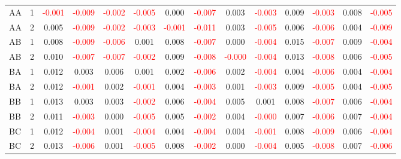 \begin{table}[!htb]
{\begin{tabular}{llcccccccccccc}
AA & 1 & \textcolor{red}{-0.001} & \textcolor{red}{-0.009} & \textcolor{red}{-0.002} & \textcolor{red}{-0.005} & 0.000 & \textcolor{red}{-0.007} & 0.003 & \textcolor{red}{-0.003} & 0.009 & \textcolor{red}{-0.003} & 0.008 & \textcolor{red}{-0.005}\\
AA & 2 & 0.005 & \textcolor{red}{-0.009} & \textcolor{red}{-0.002} & \textcolor{red}{-0.003} & \textcolor{red}{-0.001} & \textcolor{red}{-0.011} & 0.003 & \textcolor{red}{-0.005} & 0.006 & \textcolor{red}{-0.006} & 0.004 & \textcolor{red}{-0.009}\\
AB & 1 & 0.008 & \textcolor{red}{-0.009} & \textcolor{red}{-0.006} & 0.001 & 0.008 & \textcolor{red}{-0.007} & 0.000 & \textcolor{red}{-0.004} & 0.015 & \textcolor{red}{-0.007} & 0.009 & \textcolor{red}{-0.004}\\
AB & 2 & 0.010 & \textcolor{red}{-0.007} & \textcolor{red}{-0.007} & \textcolor{red}{-0.002} & 0.009 & \textcolor{red}{-0.008} & \textcolor{red}{-0.000} & \textcolor{red}{-0.004} & 0.013 & \textcolor{red}{-0.008} & 0.006 & \textcolor{red}{-0.005}\\
BA & 1 & 0.012 & 0.003 & 0.006 & 0.001 & 0.002 & \textcolor{red}{-0.006} & 0.002 & \textcolor{red}{-0.004} & 0.004 & \textcolor{red}{-0.006} & 0.004 & \textcolor{red}{-0.004}\\
BA & 2 & 0.012 & \textcolor{red}{-0.001} & 0.002 & \textcolor{red}{-0.001} & 0.004 & \textcolor{red}{-0.003} & 0.001 & \textcolor{red}{-0.003} & 0.009 & \textcolor{red}{-0.005} & 0.004 & \textcolor{red}{-0.005}\\
BB & 1 & 0.013 & 0.003 & 0.003 & \textcolor{red}{-0.002} & 0.006 & \textcolor{red}{-0.004} & 0.005 & 0.001 & 0.008 & \textcolor{red}{-0.007} & 0.006 & \textcolor{red}{-0.004}\\
BB & 2 & 0.011 & \textcolor{red}{-0.003} & 0.000 & \textcolor{red}{-0.005} & 0.005 & \textcolor{red}{-0.002} & 0.004 & \textcolor{red}{-0.000} & 0.007 & \textcolor{red}{-0.006} & 0.007 & \textcolor{red}{-0.004}\\
BC & 1 & 0.012 & \textcolor{red}{-0.004} & 0.001 & \textcolor{red}{-0.004} & 0.004 & \textcolor{red}{-0.004} & 0.004 & \textcolor{red}{-0.001} & 0.008 & \textcolor{red}{-0.009} & 0.006 & \textcolor{red}{-0.004}\\
BC & 2 & 0.013 & \textcolor{red}{-0.006} & 0.001 & \textcolor{red}{-0.005} & 0.008 & \textcolor{red}{-0.002} & 0.000 & \textcolor{red}{-0.004} & 0.005 & \textcolor{red}{-0.008} & 0.007 & \textcolor{red}{-0.006}\\
\hline
    \end{tabular}%
    }
\end{table}

